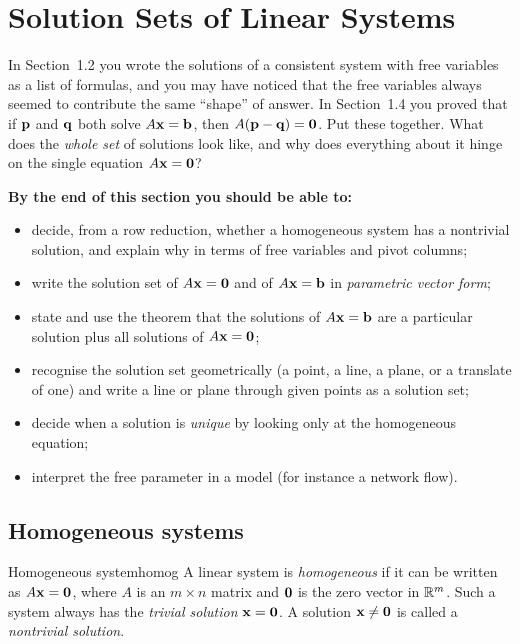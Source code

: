 \documentclass[11pt]{article}
\begin{document}
\section{Solution Sets of Linear Systems}

\begin{guide}
In Section~1.2 you wrote the solutions of a consistent system with free variables as a list of formulas, and you may have noticed that the free variables always seemed to
contribute the same ``shape'' of answer. In Section~1.4 you proved that if $\mathbf{p}$ and $\mathbf{q}$ both solve $A\mathbf{x}=\mathbf{b}$, then $A(\mathbf{p}-\mathbf{q})=\mathbf{0}$.
Put these together. What does the \emph{whole set} of solutions look like, and why does everything about it hinge on the single equation $A\mathbf{x}=\mathbf{0}$?
\end{guide}

\textbf{By the end of this section you should be able to:}
\begin{itemize}
  \item decide, from a row reduction, whether a homogeneous system has a nontrivial solution, and explain why in terms of free variables and pivot columns;
  \item write the solution set of $A\mathbf{x}=\mathbf{0}$ and of $A\mathbf{x}=\mathbf{b}$ in \emph{parametric vector form};
  \item state and use the theorem that the solutions of $A\mathbf{x}=\mathbf{b}$ are a particular solution plus all solutions of $A\mathbf{x}=\mathbf{0}$;
  \item recognise the solution set geometrically (a point, a line, a plane, or a translate of one) and write a line or plane through given points as a solution set;
  \item decide when a solution is \emph{unique} by looking only at the homogeneous equation;
  \item interpret the free parameter in a model (for instance a network flow).
\end{itemize}

\subsection*{Homogeneous systems}

\begin{defn}{Homogeneous system}{homog}
A linear system is \emph{homogeneous} if it can be written as $A\mathbf{x}=\mathbf{0}$, where $A$ is an $m\times n$ matrix and $\mathbf{0}$ is the zero vector in $\mathbb{R}^m$. Such a system always has the
\emph{trivial solution} $\mathbf{x}=\mathbf{0}$. A solution $\mathbf{x}\neq\mathbf{0}$ is called a \emph{nontrivial solution}.
\end{defn}
\end{document}
